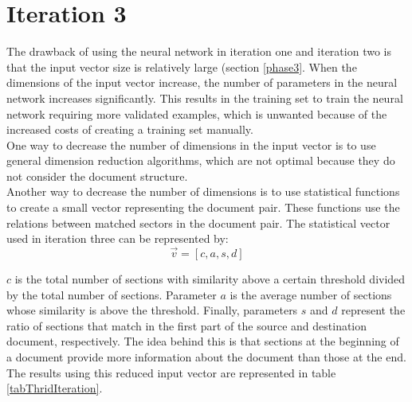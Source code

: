 { \section{Iteration 3}
 \label{secIteration3}

The drawback of using the neural network in iteration one and iteration two is that the input vector size is relatively large (section \ref{phase3}. When the dimensions of the input vector increase, the number of parameters in the neural network increases significantly. This results in the training set to train the neural network requiring more validated examples, which is unwanted because of the increased costs of creating a training set manually.\\ One way to decrease the number of dimensions in the input vector is to use general dimension reduction algorithms, which are not optimal because they do not consider the document structure. \\

Another way to decrease the number of dimensions is to use statistical functions to create a small vector representing the document pair. These functions use the relations between matched sectors in the document pair. The statistical vector used in iteration three can be represented by: $$\vec{v} = [c, a, s, d]$$

$c$ is the total number of sections with similarity above a certain threshold divided by the total number of sections. Parameter $a$ is the average number of sections whose similarity is above the threshold. Finally, parameters $s$ and $d$ represent the ratio of sections that match in the first part of the source and destination document, respectively. The idea behind this is that sections at the beginning of a document provide more information about the document than those at the end.
The results using this reduced input vector are represented in table \ref{tabThridIteration}.\\

}
